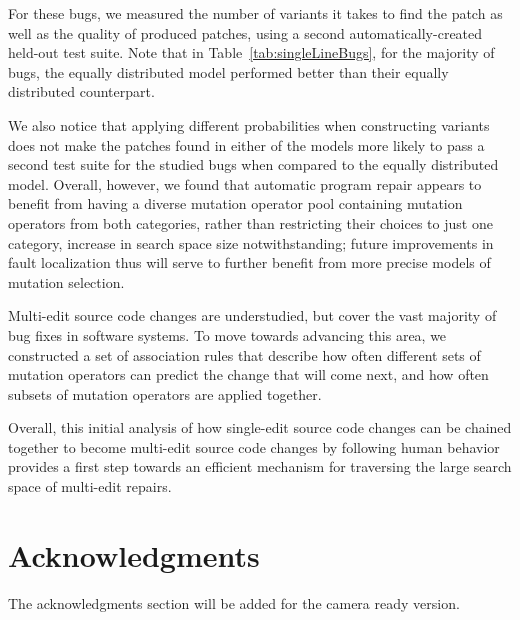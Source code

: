 \documentclass[conference]{IEEEtran}
\begin{document}
For these bugs, we measured the number of variants it takes to find the 
patch as well as the quality of produced patches, using a second 
automatically-created held-out test suite.
Note that in Table~\ref{tab:singleLineBugs}, for the majority of bugs, the 
equally distributed model performed better than their equally distributed 
counterpart.

We also notice that applying different probabilities when constructing variants
does not make the patches found in either of the models more likely to pass a
second test suite for the studied bugs when compared to the equally distributed model. Overall, however, we found that automatic program repair appears to benefit
from having a diverse mutation operator pool containing mutation operators from 
both categories,
rather than restricting their choices to just one category, increase in search
space size notwithstanding; future improvements in fault localization thus will
serve to further benefit from more precise models of mutation selection. 

Multi-edit source code changes are understudied, but cover
the vast majority of bug fixes in software systems. 
To move towards advancing this area, we constructed a set of association rules 
that describe 
how often different sets of mutation operators can predict the change that will 
come next, and how often subsets of mutation operators are applied together.

Overall, this initial analysis of how single-edit source code changes can be 
chained together 
to become multi-edit source code changes by following human behavior provides a
first step towards an efficient mechanism for traversing the large search space
of multi-edit repairs.






\section*{Acknowledgments}
The acknowledgments section will be added for the camera ready version.




\end{document}
